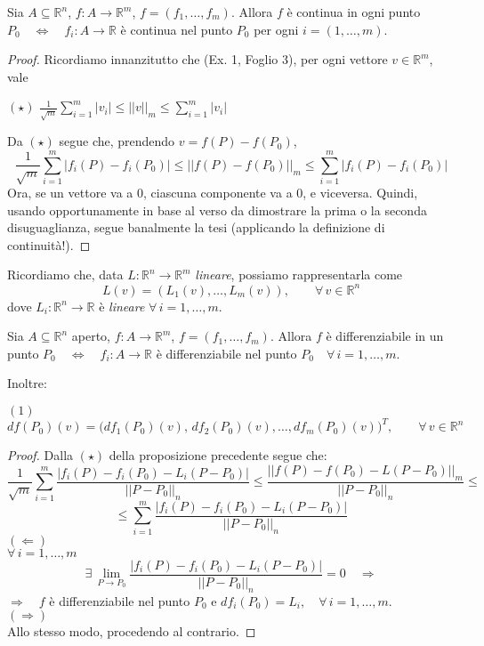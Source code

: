 \begin{proposition}
Sia $A \subseteq \mathbb{R}^n$, $f: A \longrightarrow \mathbb{R}^m$, $f=(f_1,\ldots,f_m)$. Allora $f$ è continua in ogni punto $P_0 \quad \Longleftrightarrow \quad f_i : A \longrightarrow \mathbb{R}$ è continua nel punto $P_0$ per ogni $i=(1,\ldots,m)$.
\end{proposition}
\begin{proof}
Ricordiamo innanzitutto che (Ex. 1, Foglio 3), per ogni vettore $v \in \mathbb{R}^m$, vale
\begin{center}
$\mathrm{(\star)}$
\hfill
$\displaystyle \frac{1}{\sqrt{m}} \sum_{i=1}^m|v_i| \leq ||v||_m \leq \sum_{i=1}^m|v_i|$
\hfill \null \\
\end{center}
Da $(\star)$ segue che, prendendo $v=f(P)-f(P_0)$,
$$
\frac{1}{\sqrt{m}} \sum_{i=1}^m|f_i(P)-f_i(P_0)| \leq ||f(P)-f(P_0)||_m \leq \sum_{i=1}^m|f_i(P)-f_i(P_0)|
$$
Ora, se un vettore va a $0$, ciascuna componente va a $0$, e viceversa. Quindi, usando opportunamente in base al verso da dimostrare la prima o la seconda disuguaglianza, segue banalmente la tesi (applicando la definizione di continuità!).
\end{proof}

Ricordiamo che, data $L: \mathbb{R}^n \longrightarrow \mathbb{R}^m$ \emph{lineare}, possiamo rappresentarla come
$$
L(v) = (L_1(v),\ldots,L_m(v)), \qquad \forall \, v \in \mathbb{R}^n
$$
dove $L_i: \mathbb{R}^n \longrightarrow \mathbb{R}$ è \emph{lineare} $\forall \, i=1,\ldots,m$.

\begin{proposition}
Sia $A \subseteq \mathbb{R}^n$ aperto, $f: A \longrightarrow \mathbb{R}^m$, $f=(f_1,\ldots,f_m)$. Allora $f$ è differenziabile in un punto $P_0 \quad \Longleftrightarrow \quad f_i : A \longrightarrow \mathbb{R}$ è differenziabile nel punto $P_0 \quad \forall \, i=1,\ldots,m$.

Inoltre:
\begin{center}
$\mathrm{(1)}$
\hfill
$\displaystyle df(P_0)(v) = \Big( df_1(P_0)(v),\,df_2(P_0)(v),\ldots,df_m(P_0)(v) \Big)^{T}, \qquad \forall \, v \in \mathbb{R}^n$
\hfill \null \\
\end{center}
\end{proposition}
\begin{proof}
Dalla $(\star)$ della proposizione precedente segue che:
$$
\frac{1}{\sqrt{m}} \sum_{i=1}^m \frac{|f_i(P)-f_i(P_0)-L_i(P-P_0)|}{||P-P_0||_n} \leq \frac{||f(P)-f(P_0)-L(P-P_0)||_m}{||P-P_0||_n} \leq
$$
$$
\leq \sum_{i=1}^m \frac{|f_i(P)-f_i(P_0)-L_i(P-P_0)|}{||P-P_0||_n}
$$
$(\Leftarrow)$\\
$\forall\, i=1,\ldots,m$
$$
\exists \, \lim_{P \rightarrow P_0} \frac{|f_i(P)-f_i(P_0)-L_i(P-P_0)|}{||P-P_0||_n} = 0 \quad \Longrightarrow 
$$
$\Longrightarrow \quad f$ è differenziabile nel punto $P_0$ e $df_i(P_0) = L_i, \quad \forall \, i=1,\ldots,m$.\\
$(\Rightarrow)$\\
Allo stesso modo, procedendo al contrario.
\end{proof}

